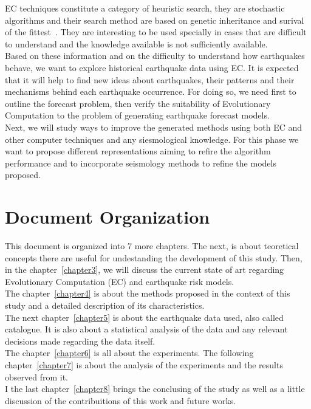 EC techniques constitute a category of heuristic search, they are stochastic algorithms and their search method are based on genetic inheritance and surival of the fittest~\cite{michalewicz1996heuristic}. They are interesting to be used specially in cases that are difficult to understand and the knowledge available is not sufficiently available.\\

Based on these information and on the difficulty to understand how earthquakes behave, we want to explore historical earthquake data using EC. It is expected that it will help to find new ideas about earthquakes, their patterns and their mechanisms behind each earthquake occurrence. For doing so, we need first to outline the forecast problem, then verify the suitability of Evolutionary Computation to the problem of generating earthquake forecast models.\\

Next, we will study ways to improve the generated methods using both EC and other computer techniques and any siesmological knowledge. For this phase we want to propose different representations aiming to refire the algorithm performance and to incorporate seismology methods to refine the models proposed.\\

\section{Document Organization}

This document is organized into 7 more chapters. The next, is about teoretical concepts there are useful for undestanding the development of this study. Then, in the chapter~\ref{chapter3}, we will discuss the current state of art regarding Evolutionary Computation (EC) and earthquake risk	 models. \\

The chapter~\ref{chapter4} is about the methods proposed in the context of this study and a detailed description of its characteristics.\\

The next chapter~\ref{chapter5} is about the earthquake data used, also called catalogue. It is also about a statistical analysis of the data and any relevant decisions made regarding the data itself.\\

The chapter~\ref{chapter6} is all about the experiments. The following chapter~\ref{chapter7} is about the analysis of the experiments and the results observed from it.\\

I the last chapter~\ref{chapter8} brings the conclusing of the study as well as a little discussion of the contribuitions of this work and future works.\\



